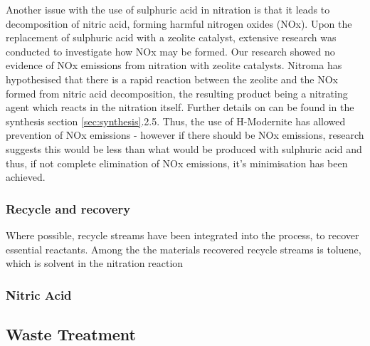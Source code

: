 Another issue with the use of sulphuric acid in nitration is that it leads to decomposition of nitric acid, forming harmful nitrogen oxides (NOx). Upon the replacement of sulphuric acid with a zeolite catalyst, extensive research was conducted to investigate how NOx may be formed. Our research showed no evidence of NOx emissions from nitration with zeolite catalysts. Nitroma has hypothesised that there is a rapid reaction between the zeolite and the NOx formed from nitric acid decomposition, the resulting product being a nitrating agent which reacts in the nitration itself. Further details on can be found in the synthesis section \ref{sec:synthesis}.2.5. Thus, the use of H-Modernite has allowed prevention of NOx emissions - however if there should be NOx emissions, research suggests this would be less than what would be produced with sulphuric acid and thus, if not complete elimination of NOx emissions, it's minimisation has been achieved.  

\subsubsection{Recycle and recovery}

Where possible, recycle streams have been integrated into the process, to recover essential reactants. Among the the materials recovered recycle streams is toluene, which is solvent in the nitration reaction


\subsubsection{Nitric Acid}








\subsection{Waste Treatment}

